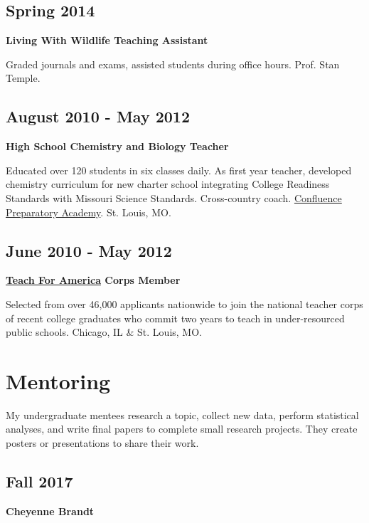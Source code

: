 \documentclass[11pt, sans]{moderncv}
\begin{document}
\subsection*{Spring 2014}
\label{sec:orgfa6ffc9}
\textbf{Living With Wildlife Teaching Assistant}

Graded journals and exams, assisted students during office hours.
Prof. Stan Temple.

\subsection*{August 2010 - May 2012}
\label{sec:org4816d25}
\textbf{High School Chemistry and Biology Teacher}

Educated over 120 students in six classes daily. As first year
teacher, developed chemistry curriculum for new charter school
integrating College Readiness Standards with Missouri Science
Standards. Cross-country coach. \href{https://www.google.com/search?q=Confluence+Preparatory+Academy+St.+Louis\&oq=Confluence+Prep+Academy+St.+Louis\&aqs=chrome..69i57.7294j0j8\&sourceid=chrome\&ie=UTF-8\#q=Confluence+Prep+Academy+High+School+St.+Louis}{Confluence Preparatory Academy}. St. Louis, MO.

\subsection*{June 2010 - May 2012}
\label{sec:org3f3331d}
\textbf{\href{https://www.teachforamerica.org/}{Teach For America} Corps Member}

Selected from over 46,000 applicants nationwide to join the national
teacher corps of recent college graduates who commit two years to
teach in under-resourced public schools.  Chicago, IL \& St. Louis, MO.

\section*{Mentoring}
\label{sec:org5b6080a}

My undergraduate mentees research a topic, collect new data, perform statistical
analyses, and write final papers to complete small research projects.  They
create posters or presentations to share their work.

\subsection*{Fall 2017}
\label{sec:orgad4d46b}
\textbf{Cheyenne Brandt}
\end{document}
